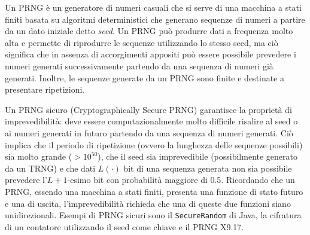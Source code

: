 \documentclass[answers, a4paper, 11pt]{exam}
\begin{document}
\begin{questions}
\begin{parts}
\begin{solution}
Un PRNG è un generatore di numeri casuali che si serve di una macchina a stati finiti basata su algoritmi deterministici che generano sequenze di numeri a partire da un dato iniziale detto \textit{seed}.
Un PRNG può produrre dati a frequenza molto alta e permette di riprodurre le sequenze utilizzando lo stesso seed, ma ciò significa che in assenza di accorgimenti appositi può essere possibile prevedere i numeri generati successivamente partendo da una sequenza di numeri già generati. 
Inoltre, le sequenze generate da un PRNG sono finite e destinate a presentare ripetizioni.

Un PRNG sicuro (Cryptographically Secure PRNG) garantisce la proprietà di imprevedibilità: deve essere computazionalmente molto difficile risalire al seed o ai numeri generati in futuro partendo da una sequenza di numeri generati. 
Ciò implica che il periodo di ripetizione (ovvero la lunghezza delle sequenze possibili) sia molto grande ($>10^{50}$), che il seed sia imprevedibile (possibilmente generato da un TRNG) e che dati $L(\cdot)$ bit di una sequenza generata non sia possibile prevedere l'$L+1$-esimo bit con probabilità maggiore di 0.5.
Ricordando che un PRNG, essendo una macchina a stati finiti, presenta una funzione di stato futuro e una di uscita, l'imprevedibilità richieda che una di queste due funzioni siano unidirezionali. 
Esempi di PRNG sicuri sono il \texttt{SecureRandom} di Java, la cifratura di un contatore utilizzando il seed come chiave e il PRNG X9.17.
\end{solution}

\end{parts}
\end{questions}
\end{document}
